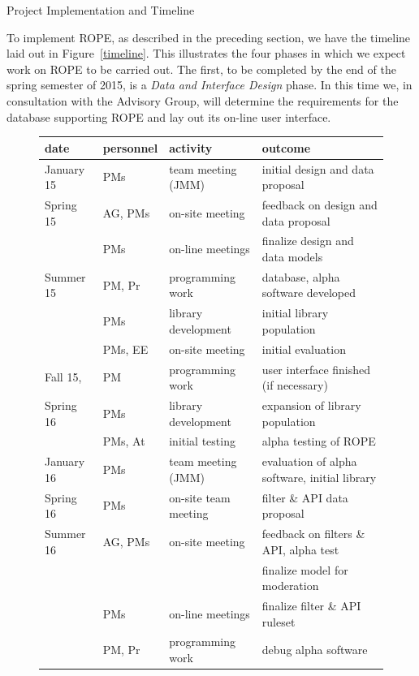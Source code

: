 \documentclass[11pt]{article}
\begin{document}
\begin{section}{Project Implementation and Timeline}

To implement ROPE, as described in the preceding section, we have the
timeline laid out in Figure~\ref{timeline}.  This illustrates the four
phases in which we expect work on ROPE to be carried out.  The first,
to be completed by the end of the spring semester of 2015, is a \emph{Data
and Interface Design} phase.  In this time we, in consultation with
the Advisory Group, will determine the requirements for the database
supporting ROPE and lay out its on-line user interface.

\begin{figure}
\begin{center}
\begin{tabular}{|l|l|l|l|}
  \hline
  \textbf{date} & \textbf{personnel} & \textbf{activity} & \textbf{outcome}\\
  \hline
  \hline
  January 15 & PMs & team meeting (JMM) & initial design and data proposal\\
  \hline
  Spring 15 & AG, PMs & on-site meeting
	& feedback on design and data proposal\\
	& PMs & on-line meetings & finalize design and data models\\
  \hline
  Summer 15 & PM, Pr & programming work & database, alpha
	software developed \\ 
	& PMs & library development & initial library population \\
	& PMs, EE & on-site meeting & initial evaluation \\
  \hline
  Fall 15, & PM & programming work & user interface finished (if
	necessary) \\ 
  Spring 16 & PMs & library development & expansion of library population \\
	& PMs, At & initial testing & alpha testing of ROPE \\
  \hline 
  January 16 & PMs & team meeting (JMM) & evaluation of alpha software,
	initial library \\
  \hline
  Spring 16 & PMs & on-site team meeting & filter \& API data proposal \\
  \hline
  Summer 16 & AG, PMs & on-site meeting &
 	feedback on filters \& API, alpha test \\
	& & & finalize model for moderation \\
	& PMs & on-line meetings & finalize filter \& API ruleset \\
	& PM, Pr & programming work & debug alpha software \\

\end{tabular}
\end{center}
\end{figure}
\end{section}
\end{document}
